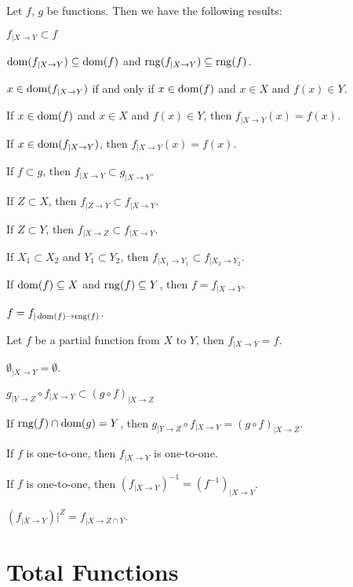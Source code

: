 \documentclass{article}
\begin{document}
Let $f$, $g$ be functions. Then we have the following results:
\begin{thm}
\item\label{partfun1:22} $f_{|X\to Y}\subset f$
\item\label{partfun1:23} $\operatorname{dom}(f_{|X\to Y})\subseteq\operatorname{dom}(f)$ and $\operatorname{rng}(f_{|X\to Y})\subseteq\operatorname{rng}(f)$.
\item\label{partfun1:24} $x\in\operatorname{dom}(f_{|X\to Y})$ if and only if
  $x\in\operatorname{dom}(f)$ and $x\in X$ and $f(x)\in Y$.
\item\label{partfun1:25} If $x\in\operatorname{dom}(f)$ and $x\in X$ and $f(x)\in Y$,
  then $f_{|X\to Y}(x)=f(x)$.
\item\label{partfun1:26} If $x\in\operatorname{dom}(f_{|X\to Y})$, then $f_{|X\to Y}(x)=f(x)$.
\item\label{partfun1:27} If $f\subset g$, then $f_{|X\to Y}\subset g_{|X\to Y}$.
\item\label{partfun1:28} If $Z\subset X$, then
  $f_{|Z\to Y}\subset f_{|X\to Y}$.
\item\label{partfun1:29} If $Z\subset Y$, then
  $f_{|X\to Z}\subset f_{|X\to Y}$.
\item\label{partfun1:30} If $X_{1}\subset X_{2}$ and $Y_{1}\subset Y_{2}$,
  then $f_{|X_{1}\to Y_{1}}\subset f_{|X_{2}\to Y_{2}}$.
\item\label{partfun1:31} If $\operatorname{dom}(f)\subseteq X$ and $\operatorname{rng}(f)\subseteq Y$,
  then $f=f_{|X\to Y}$.
\item\label{partfun1:32} $f=f_{|\operatorname{dom}(f)\to\operatorname{rng}(f)}$.
\item\label{partfun1:33} Let $f$ be a partial function from $X$ to $Y$,
  then $f_{|X\to Y}=f$.
\item\label{partfun1:34} $\emptyset_{|X\to Y}=\emptyset$.
\item\label{partfun1:35} $g_{|Y\to Z}\circ f_{|X\to Y}\subset(g\circ f)_{|X\to Z}$
\item\label{partfun1:36} If $\operatorname{rng}(f)\cap\operatorname{dom}(g)=Y$, then
  $g_{|Y\to Z}\circ f_{|X\to Y}=(g\circ f)_{|X\to Z}$.
\item\label{partfun1:37} If $f$ is one-to-one,
  then $f_{|X\to Y}$ is one-to-one.
\item\label{partfun1:38} If $f$ is one-to-one,
  then $(f_{|X\to Y})^{-1}=(f^{-1})_{|X\to Y}$.
\item\label{partfun1:39} $(f_{|X\to Y})|^{Z}=f_{|X\to Z\cap Y}$.
\end{thm}

\section{Total Functions}
\end{document}
